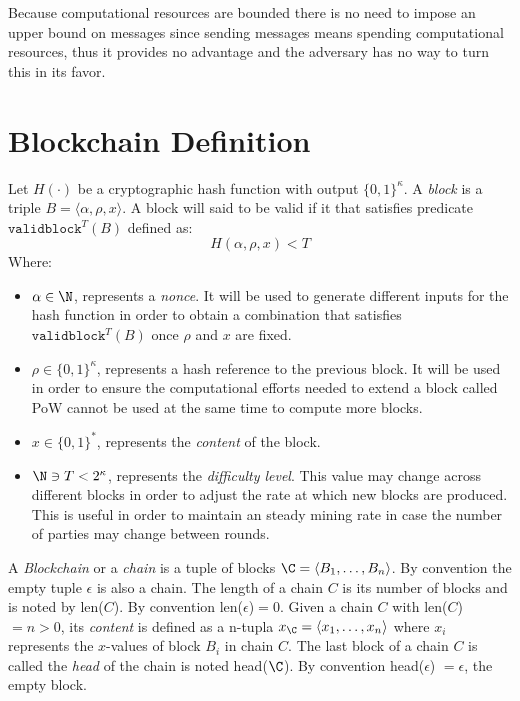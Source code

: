 \documentclass[..]{subfiles}
\begin{document}
\begin{remark}\label{rem:messages_bound}
	\normalfont
	Because computational resources are bounded there is no need to impose an upper bound on messages since sending messages means spending computational resources, thus it provides no advantage and the adversary has no way to turn this in its favor.
\end{remark}



\section{Blockchain Definition}

Let $H(\cdot)$ be a cryptographic hash function with output $\{0,1\}^\kappa$. A \textit{block} is a triple $B = \langle \alpha, \rho, x \rangle$. A block will said to be valid if it that satisfies predicate $\texttt{validblock}^T(B)$ defined as:
$$H(\alpha, \rho, x) < T$$
Where:
\begin{itemize}
	\item $\alpha \in \N$, represents a \textit{nonce}. It will be used to generate different inputs for the hash function in order to obtain a combination that satisfies $\texttt{validblock}^T(B)$ once $\rho$ and $x$ are fixed.

	\item $\rho \in \{0,1\}^\kappa$, represents a hash reference to the previous block. It will be used in order to ensure the computational efforts needed to extend a block called PoW cannot be used at the same time to compute more blocks.

	\item $x \in \{0,1\}^*$, represents the \textit{content} of the block.

	\item $\N \ni T<2^\kappa$, represents the \textit{difficulty level}. This value may change across different blocks in order to adjust the rate at which new blocks are produced. This is useful in order to maintain an steady mining rate in case the number of parties may change between rounds.
\end{itemize}

A \textit{Blockchain} or a \textit{chain} is a tuple of blocks $\C = \langle B_1, \dots, B_n \rangle$. By convention the empty tuple $\epsilon$ is also a chain. The length of a chain $C$ is its number of blocks and is noted by len($C$). By convention len($\epsilon$)$= 0$. Given a chain $C$ with len($C$)$ = n > 0$, its \textit{content}  is defined as a n-tupla $x_{\C} = \langle x_1,\dots, x_n \rangle$ where $x_i$ represents the $x$-values of block $B_i$ in chain $C$. The last block of a chain $C$ is called the \textit{head} of the chain is noted head($\C$). By convention head($\epsilon$) $= \epsilon$, the empty block.
\end{document}

